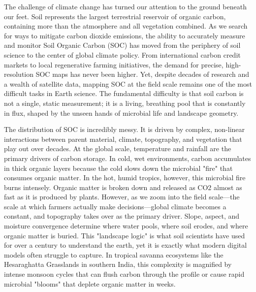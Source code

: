 \documentclass[conference]{IEEEtran}
\begin{document}
The challenge of climate change has turned our attention to the ground beneath our feet. Soil represents the largest terrestrial reservoir of organic carbon, containing more than the atmosphere and all vegetation combined. As we search for ways to mitigate carbon dioxide emissions, the ability to accurately measure and monitor Soil Organic Carbon (SOC) has moved from the periphery of soil science to the center of global climate policy. From international carbon credit markets to local regenerative farming initiatives, the demand for precise, high-resolution SOC maps has never been higher. Yet, despite decades of research and a wealth of satellite data, mapping SOC at the field scale remains one of the most difficult tasks in Earth science. The fundamental difficulty is that soil carbon is not a single, static measurement; it is a living, breathing pool that is constantly in flux, shaped by the unseen hands of microbial life and landscape geometry.

The distribution of SOC is incredibly messy. It is driven by complex, non-linear interactions between parent material, climate, topography, and vegetation that play out over decades. At the global scale, temperature and rainfall are the primary drivers of carbon storage. In cold, wet environments, carbon accumulates in thick organic layers because the cold slows down the microbial "fire" that consumes organic matter. In the hot, humid tropics, however, this microbial fire burns intensely. Organic matter is broken down and released as CO2 almost as fast as it is produced by plants. However, as we zoom into the field scale—the scale at which farmers actually make decisions—global climate becomes a constant, and topography takes over as the primary driver. Slope, aspect, and moisture convergence determine where water pools, where soil erodes, and where organic matter is buried. This "landscape logic" is what soil scientists have used for over a century to understand the earth, yet it is exactly what modern digital models often struggle to capture. In tropical savanna ecosystems like the Hesaraghatta Grasslands in southern India, this complexity is magnified by intense monsoon cycles that can flush carbon through the profile or cause rapid microbial "blooms" that deplete organic matter in weeks.
\end{document}
